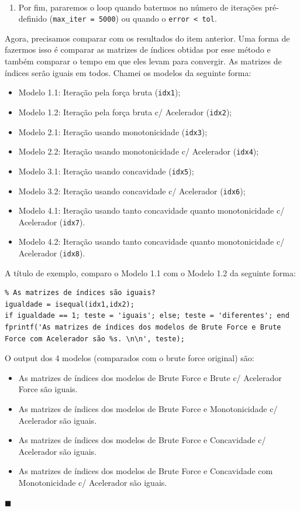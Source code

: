 \documentclass[10pt]{article}
\newcommand*{\QEDA}{\hfill\ensuremath{\blacksquare}}%
\newcommand\0{\mathbf{0}}
\newenvironment{sol}
    {\\[1em] {\color{magenta}\text{Resposta.}}
    }
    {{\color{blue!50!black}\QEDA}}
\begin{document}
\begin{enumerate}[wide]
\begin{sol}
\begin{enumerate}[wide]
\item Por fim, pararemos o loop quando batermos no número de iterações pré-definido (\texttt{max\_iter = 5000}) ou quando o \texttt{error < tol}.   

\end{enumerate} 


Agora, precisamos comparar com os resultados do item anterior. Uma forma de fazermos isso é comparar as matrizes de índices obtidas por esse método e também comparar o tempo em que eles levam para convergir. As matrizes de índices serão iguais em todos. Chamei os modelos da seguinte forma:

\begin{itemize}
\item Modelo 1.1: Iteração pela força bruta (\texttt{idx1});
\item Modelo 1.2: Iteração pela força bruta c/ Acelerador (\texttt{idx2});
\item Modelo 2.1: Iteração usando monotonicidade (\texttt{idx3}); 
\item Modelo 2.2: Iteração usando monotonicidade c/ Acelerador (\texttt{idx4}); 
\item Modelo 3.1: Iteração usando concavidade (\texttt{idx5}); 
\item Modelo 3.2: Iteração usando concavidade c/ Acelerador (\texttt{idx6}); 
\item Modelo 4.1: Iteração usando tanto concavidade quanto monotonicidade c/ Acelerador (\texttt{idx7}).
\item Modelo 4.2: Iteração usando tanto concavidade quanto monotonicidade c/ Acelerador (\texttt{idx8}).
\end{itemize}

A título de exemplo, comparo o Modelo 1.1 com o Modelo 1.2 da seguinte forma: \vspace{-0.3cm}
\begin{lstlisting}
% As matrizes de índices são iguais?
igualdade = isequal(idx1,idx2);
if igualdade == 1; teste = 'iguais'; else; teste = 'diferentes'; end
fprintf('As matrizes de índices dos modelos de Brute Force e Brute Force com Acelerador são %s. \n\n', teste);
\end{lstlisting}

\newpage

O output dos 4 modelos (comparados com o brute force original) são:
\begin{itemize}
\item As matrizes de índices dos modelos de Brute Force e Brute c/ Acelerador Force são iguais. 
\item As matrizes de índices dos modelos de Brute Force e Monotonicidade c/ Acelerador são iguais. 
\item As matrizes de índices dos modelos de Brute Force e Concavidade c/ Acelerador são iguais.
\item As matrizes de índices dos modelos de Brute Force e Concavidade com Monotonicidade c/ Acelerador são iguais.
\end{itemize}


\end{sol}
\end{enumerate}
\end{document}
